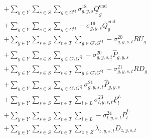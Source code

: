 \documentclass{article}
\newcommand{\sGenerators}{G}
\newcommand{\sStorage}{G^{\mathrm{Q}}}
\newcommand{\sStorageCandidate}{G^{\mathrm{C,Q}}}
\newcommand{\sYears}{Y}
\newcommand{\sScenarios}{S}
\newcommand{\sIntervals}{T}
\newcommand{\sZones}{Z}
\newcommand{\sLinks}{L}
\newcommand{\iGenerator}{g}
\newcommand{\iYear}{y}
\newcommand{\iScenario}{s}
\newcommand{\iInterval}{t}
\newcommand{\iIntervalStart}{\underline{\iInterval}}
\newcommand{\iZone}{z}
\newcommand{\iLink}{l}
\newcommand{\cRampRateUp}[1][\iGenerator]{RU_{#1}}
\newcommand{\cRampRateDown}[1][\iGenerator]{RD_{#1}}
\newcommand{\cStorageUnitEnergyIntervalEndMax}[1][\iGenerator]{\overline{Q}^{\mathrm{end}}_{#1}}
\newcommand{\cStorageUnitEnergyIntervalEndMin}[1][\iGenerator]{\underline{Q}^{\mathrm{end}}_{#1}}
\newcommand{\cDemand}[1][\iZone,\iYear,\iScenario,\iInterval]{D_{#1}}
\newcommand{\cPowerFlowMin}{\underline{P}_{\iLink}^{L}}
\newcommand{\cPowerFlowMax}{\overline{P}_{\iLink}^{L}}
\newcommand{\cPowerInitial}[1][\iGenerator,\iYear,\iScenario]{\hat{P}_{#1}}
\newcommand{\vStorageUnitEnergy}[1][\iGenerator,\iYear,\iScenario,\iInterval]{q_{#1}}
\newcommand{\vLostLoadPower}[1][\iZone,\iYear,\iScenario,\iInterval]{p^{\mathrm{V}}_{#1}}
\newcommand{\vInstalledCapacityTotal}[1][\iGenerator,\iYear]{a_{#1}}
\newcommand{\dMaxStorageEnergyCandidate}[1][\iGenerator,\iYear,\iScenario,\iInterval]{\sigma_{#1}^{17}}
\newcommand{\dMinStorageEnergyIntervalEnd}[1][\iGenerator,\iYear,\iScenario]{\sigma_{#1}^{18}}
\newcommand{\dMaxStorageEnergyIntervalEnd}[1][\iGenerator,\iYear,\iScenario]{\sigma_{#1}^{19}}
\newcommand{\dRampRateUp}[1][\iGenerator,\iYear,\iScenario,\iInterval]{\sigma_{#1}^{20}}
\newcommand{\dRampRateDown}[1][\iGenerator,\iYear,\iScenario,\iInterval]{\sigma_{#1}^{21}}
\newcommand{\dNonNegativeLostLoad}[1][\iZone,\iYear,\iScenario,\iInterval]{\sigma_{#1}^{22}}
\newcommand{\dMinPowerFlow}[1][\iLink,\iYear,\iScenario,\iInterval]{\sigma_{#1}^{23}}
\newcommand{\dMaxPowerFlow}[1][\iLink,\iYear,\iScenario,\iInterval]{\sigma_{#1}^{24}}
\newcommand{\dPowerBalance}[1][\iZone,\iYear,\iScenario,\iInterval]{\lambda_{#1}}
\begin{document}
\begin{align}
\begin{split}
& + \sum\limits_{\iYear \in \sYears}\sum\limits_{\iScenario \in \sScenarios} \sum\limits_{\iGenerator \in \sStorage} \dMinStorageEnergyIntervalEnd \cStorageUnitEnergyIntervalEndMin\\
& + \sum\limits_{\iYear \in \sYears}\sum\limits_{\iScenario \in \sScenarios} \sum\limits_{\iGenerator \in \sStorage} - \dMaxStorageEnergyIntervalEnd \cStorageUnitEnergyIntervalEndMax\\
& + \sum\limits_{\iYear \in \sYears}\sum\limits_{\iScenario \in \sScenarios}\sum\limits_{\iInterval \in \sIntervals} \sum\limits_{\iGenerator \in \sGenerators \setminus \sStorage} - \dRampRateUp \cRampRateUp\\
& + \sum\limits_{\iYear \in \sYears}\sum\limits_{\iScenario \in \sScenarios} \sum\limits_{\iGenerator \in \sGenerators \setminus \sStorage} - \dRampRateUp[\iGenerator,\iYear,\iScenario,\iIntervalStart] \cPowerInitial\\
& + \sum\limits_{\iYear \in \sYears}\sum\limits_{\iScenario \in \sScenarios}\sum\limits_{\iInterval \in \sIntervals} \sum\limits_{\iGenerator \in \sGenerators \setminus \sStorage} - \dRampRateDown \cRampRateDown\\
& + \sum\limits_{\iYear \in \sYears}\sum\limits_{\iScenario \in \sScenarios} \sum\limits_{\iGenerator \in \sGenerators \setminus \sStorage} \dRampRateDown[\iGenerator,\iYear,\iScenario,\iIntervalStart] \cPowerInitial\\
& + \sum\limits_{\iYear \in \sYears}\sum\limits_{\iScenario \in \sScenarios}\sum\limits_{\iInterval \in \sIntervals} \sum\limits_{\iLink \in \sLinks} \dMinPowerFlow \cPowerFlowMin\\
& + \sum\limits_{\iYear \in \sYears}\sum\limits_{\iScenario \in \sScenarios}\sum\limits_{\iInterval \in \sIntervals} \sum\limits_{\iLink \in \sLinks} - \dMaxPowerFlow \cPowerFlowMax\\
& + \sum\limits_{\iYear \in \sYears}\sum\limits_{\iScenario \in \sScenarios}\sum\limits_{\iInterval \in \sIntervals} \sum\limits_{\iZone \in \sZones} \dPowerBalance \cDemand\\

\end{split}
\end{align}
\end{document}
